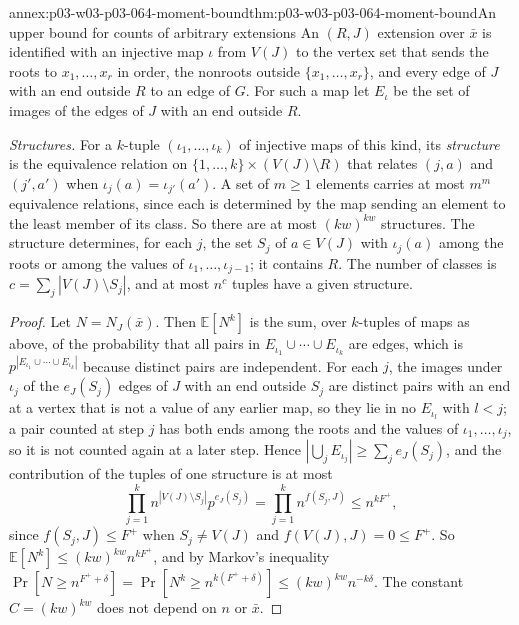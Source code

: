 \begin{annexitem}{annex:p03-w03-p03-064-moment-bound}{thm:p03-w03-p03-064-moment-bound}{An upper bound for counts of arbitrary extensions}
An \((R,J)\) extension over \(\bar x\) is identified with an injective map
\(\iota\) from \(V(J)\) to the vertex set that sends the roots to
\(x_1,\ldots,x_r\) in order, the nonroots outside \(\{x_1,\ldots,x_r\}\), and
every edge of \(J\) with an end outside \(R\) to an edge of \(G\).  For such
a map let \(E_\iota\) be the set of images of the edges of \(J\) with an end
outside \(R\).

\emph{Structures.}  For a \(k\)-tuple \((\iota_1,\ldots,\iota_k)\) of
injective maps of this kind, its \emph{structure} is the equivalence
relation on \(\{1,\ldots,k\}\times(V(J)\setminus R)\) that relates \((j,a)\)
and \((j',a')\) when \(\iota_j(a)=\iota_{j'}(a')\).  A set of \(m\geq1\)
elements carries at most \(m^m\) equivalence relations, since each is
determined by the map sending an element to the least member of its class.
So there are at most \((kw)^{kw}\) structures.  The structure determines,
for each \(j\), the set \(S_j\) of \(a\in V(J)\) with \(\iota_j(a)\) among the
roots or among the values of \(\iota_1,\ldots,\iota_{j-1}\); it contains
\(R\).  The number of classes is \(c=\sum_j|V(J)\setminus S_j|\), and at most
\(n^c\) tuples have a given structure.

\begin{proof}
Let \(N=N_J(\bar x)\).  Then \(\mathbb E[N^k]\) is the sum, over
\(k\)-tuples of maps as above, of the probability that all pairs in
\(E_{\iota_1}\cup\cdots\cup E_{\iota_k}\) are edges, which is
\(p^{|E_{\iota_1}\cup\cdots\cup E_{\iota_k}|}\) because distinct pairs are
independent.  For each \(j\), the images under \(\iota_j\) of the
\(e_J(S_j)\) edges of \(J\) with an end outside \(S_j\) are distinct pairs
with an end at a vertex that is not a value of any earlier map, so they lie
in no \(E_{\iota_l}\) with \(l<j\); a pair counted at step \(j\) has both ends
among the roots and the values of \(\iota_1,\ldots,\iota_j\), so it is not counted again at
a later step.  Hence \(|\bigcup_jE_{\iota_j}|\geq\sum_je_J(S_j)\), and the
contribution of the tuples of one structure is at most
\[
  \prod_{j=1}^kn^{|V(J)\setminus S_j|}p^{e_J(S_j)}=\prod_{j=1}^kn^{f(S_j,J)}
  \leq n^{kF^+},
\]
since \(f(S_j,J)\leq F^+\) when \(S_j\neq V(J)\) and \(f(V(J),J)=0\leq F^+\).
So \(\mathbb E[N^k]\leq(kw)^{kw}n^{kF^+}\), and by Markov's inequality
\(\Pr[N\geq n^{F^++\delta}]=\Pr[N^k\geq n^{k(F^++\delta)}]\leq
(kw)^{kw}n^{-k\delta}\).  The constant \(C=(kw)^{kw}\) does not depend on
\(n\) or \(\bar x\).
\end{proof}
\end{annexitem}

